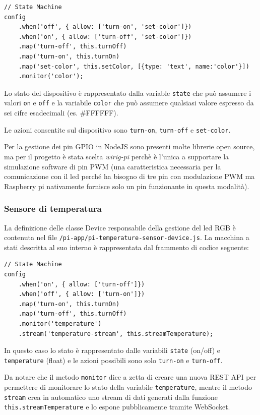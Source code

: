 \documentclass[]{scrartcl}
\begin{document}
\begin{lstlisting}[caption=Definizione della macchina a stati del led RGB]
// State Machine
config
	.when('off', { allow: ['turn-on', 'set-color']})
	.when('on', { allow: ['turn-off', 'set-color']})
	.map('turn-off', this.turnOff)
	.map('turn-on', this.turnOn)
	.map('set-color', this.setColor, [{type: 'text', name:'color'}])
	.monitor('color');
\end{lstlisting}

Lo stato del dispositivo è rappresentato dalla variable \texttt{state} che può assumere i valori \texttt{on} e \texttt{off} e la variabile \texttt{color} che può assumere qualsiasi valore espresso da sei cifre esadecimali (es. \#FFFFFF).

Le azioni consentite sul dispositivo sono \texttt{turn-on}, \texttt{turn-off} e \texttt{set-color}.

Per la gestione dei pin GPIO in NodeJS sono presenti molte librerie open source, ma per il progetto è stata scelta \textit{wirig-pi} perchè è l'unica a supportare la simulazione software di pin PWM (una caratteristica necessaria per la comunicazione con il led perché ha bisogno di tre pin con modulazione PWM ma Raspberry pi nativamente fornisce solo un pin funzionante in questa modalità).

\subsubsection{Sensore di temperatura}

La definizione delle classe Device responsabile della gestione del led RGB è contenuta nel file \texttt{/pi-app/pi-temperature-sensor-device.js}. La macchina a stati descritta al suo interno è rappresentata dal frammento di codice seguente:

\begin{lstlisting}[caption=Definizione della macchina a stati del sensore di temperatura]
// State Machine
config
	.when('on', { allow: ['turn-off']})
	.when('off', { allow: ['turn-on']})
	.map('turn-on', this.turnOn)
	.map('turn-off', this.turnOff)
	.monitor('temperature')
	.stream('temperature-stream', this.streamTemperature);
\end{lstlisting}

In questo caso lo stato è rappresentato dalle variabili \texttt{state} (on/off) e \texttt{temperature} (float) e le azioni possibili sono solo \texttt{turn-on} e \texttt{turn-off}.

Da notare che il metodo \texttt{monitor} dice a zetta di creare una nuova REST API per permettere di monitorare lo stato della variabile \texttt{temperature}, mentre il metodo \texttt{stream} crea in automatico uno stream di dati generati dalla funzione \texttt{this.streamTemperature} e lo espone pubblicamente tramite WebSocket.
\end{document}
